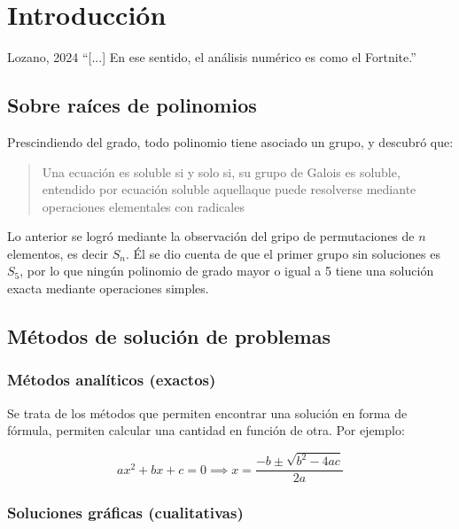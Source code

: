 \chapter{Introducción}

\begin{chapquote}{Lozano, 2024}
    ``[...] En ese sentido, el análisis numérico es como el Fortnite.''
\end{chapquote}


\section{Sobre raíces de polinomios}

Prescindiendo del grado, todo polinomio tiene asociado un grupo, y
descubró que:

\begin{quote}
    Una ecuación es soluble si y solo si, su grupo de Galois es soluble,
    entendido por ecuación soluble aquellaque puede resolverse mediante
    operaciones elementales con radicales
\end{quote}

Lo anterior se logró mediante la observación del gripo de permutaciones
de \(n\) elementos, es decir \(S_n\). Él se dio cuenta de que el primer
grupo sin soluciones es \(S_5\), por lo que ningún polinomio de grado
mayor o igual a 5 tiene una solución exacta mediante operaciones
simples.

\section{Métodos de solución de problemas}

\subsection{Métodos analíticos (exactos)}

Se trata de los métodos que permiten encontrar una solución en forma de
fórmula, permiten calcular una cantidad en función de otra. Por ejemplo:

\begin{equation}{
        ax^2 + bx + c = 0 \implies x = \frac{-b \pm \sqrt{b^2 -4ac}}{2a}
}\end{equation}

\subsection{Soluciones gráficas (cualitativas)}


